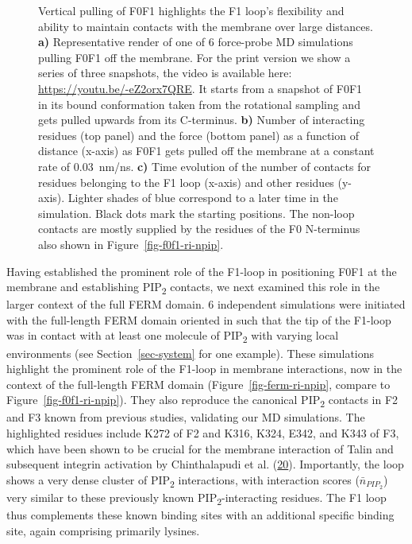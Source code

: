 \documentclass[
  twocolumn]{biophys-new-mod}
\begin{document}
\begin{figure}
\begin{minipage}[t]{\linewidth}
{{}

}

\subcaption{\label{fig-f0f1-vert-pull-contacts}~}
\end{minipage}%

\caption{\label{fig-f0f1-vert-pull}Vertical pulling of F0F1 highlights
the F1 loop's flexibility and ability to maintain contacts with the
membrane over large distances. \textbf{a)} Representative render of one
of 6 force-probe MD simulations pulling F0F1 off the membrane. For the
print version we show a series of three snapshots, the video is
available here: \url{https://youtu.be/-eZ2orx7QRE}. It starts from a
snapshot of F0F1 in its bound conformation taken from the rotational
sampling and gets pulled upwards from its C-terminus. \textbf{b)} Number
of interacting residues (top panel) and the force (bottom panel) as a
function of distance (x-axis) as F0F1 gets pulled off the membrane at a
constant rate of 0.03~nm/ns. \textbf{c)} Time evolution of the number of
contacts for residues belonging to the F1 loop (x-axis) and other
residues (y-axis). Lighter shades of blue correspond to a later time in
the simulation. Black dots mark the starting positions. The non-loop
contacts are mostly supplied by the residues of the F0 N-terminus also
shown in Figure~\ref{fig-f0f1-ri-npip}.}

\end{figure}

Having established the prominent role of the F1-loop in positioning F0F1
at the membrane and establishing PIP\textsubscript{2} contacts, we next
examined this role in the larger context of the full FERM domain. 6
independent simulations were initiated with the full-length FERM domain
oriented in such that the tip of the F1-loop was in contact with at
least one molecule of PIP\textsubscript{2} with varying local
environments (see Section~\ref{sec-system} for one example). These
simulations highlight the prominent role of the F1-loop in membrane
interactions, now in the context of the full-length FERM domain
(Figure~\ref{fig-ferm-ri-npip}, compare to
Figure~\ref{fig-f0f1-ri-npip}). They also reproduce the canonical
PIP\textsubscript{2} contacts in F2 and F3 known from previous studies,
validating our MD simulations. The highlighted residues include K272 of
F2 and K316, K324, E342, and K343 of F3, which have been shown to be
crucial for the membrane interaction of Talin and subsequent integrin
activation by Chinthalapudi et al.
(\protect\hyperlink{ref-chinthalapudiInteractionTalinCell2018a}{20}).
Importantly, the loop shows a very dense cluster of PIP\textsubscript{2}
interactions, with interaction scores (\(\bar n_{PIP_2}\)) very similar
to these previously known PIP\textsubscript{2}-interacting residues. The
F1 loop thus complements these known binding sites with an additional
specific binding site, again comprising primarily lysines.
\end{document}
